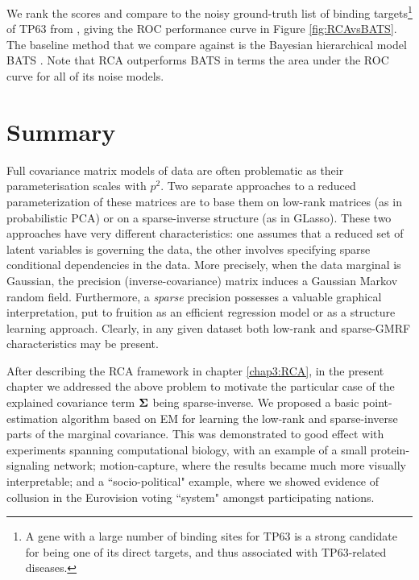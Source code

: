     We rank the scores and compare to the noisy ground-truth list of binding targets\footnote{A gene with a large number of binding sites for TP63 is a strong candidate for being one of its direct targets, and thus associated with TP63-related diseases.} of TP63 from \citep{della2008direct}, giving the ROC performance curve in Figure \ref{fig:RCAvsBATS}. The baseline method that we compare against is the Bayesian hierarchical model BATS %
\citep{angelini2007bayesian}. Note that RCA outperforms BATS in terms the area under the ROC curve for all of its noise models.




  \section{Summary}
  
    Full covariance matrix models of data are often problematic as their parameterisation scales with $p^2$.
    Two separate approaches to a reduced parameterization of these matrices are to base them on low-rank matrices (as in probabilistic PCA) or on a sparse-inverse structure (as in GLasso).
    These two approaches have very different characteristics: one assumes that a reduced set of latent variables is governing the data, the other involves specifying sparse conditional dependencies in the data.
    More precisely, when the data marginal is Gaussian, the precision (inverse-covariance) matrix induces a Gaussian Markov random field.
    Furthermore, a \emph{sparse} precision possesses a valuable graphical interpretation, put to fruition as an efficient regression model or as a structure learning approach.
    Clearly, in any given dataset both low-rank and sparse-GMRF characteristics may be present.
    
    After describing the RCA framework in chapter \ref{chap3:RCA}, in the present chapter we addressed the above problem to motivate the particular case of the explained covariance term $\mathbf{\Sigma}$ being sparse-inverse.
    We proposed a basic point-estimation algorithm based on EM for learning the low-rank and sparse-inverse parts of the marginal covariance.
    This was demonstrated to good effect with experiments spanning computational biology, with an example of a small protein-signaling network; motion-capture, where the results became much more visually interpretable; and a ``socio-political" example, where we showed evidence of collusion in the Eurovision voting ``system" amongst participating nations.
    
